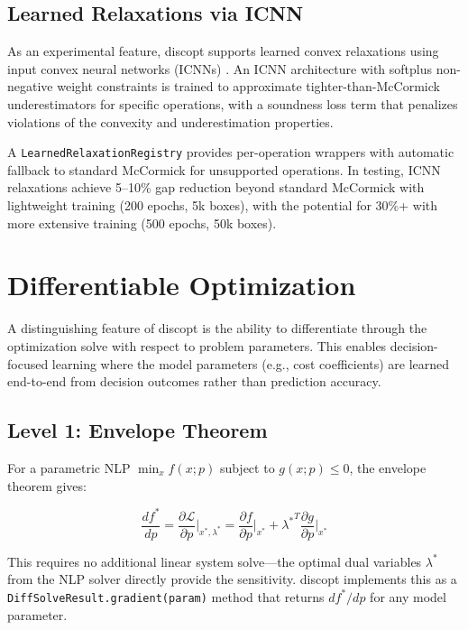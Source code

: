 \documentclass[12pt,preprint]{article}
\begin{document}
\subsection{Learned Relaxations via ICNN}
\label{org-learned-relaxations-via-icnn}
As an experimental feature, discopt supports learned convex relaxations using input convex neural networks (ICNNs) \cite{Amos2017icnn}. An ICNN architecture with softplus non-negative weight constraints is trained to approximate tighter-than-McCormick underestimators for specific operations, with a soundness loss term that penalizes violations of the convexity and underestimation properties.


A \texttt{LearnedRelaxationRegistry} provides per-operation wrappers with automatic fallback to standard McCormick for unsupported operations. In testing, ICNN relaxations achieve 5--10\% gap reduction beyond standard McCormick with lightweight training (200 epochs, 5k boxes), with the potential for 30\%+ with more extensive training (500 epochs, 50k boxes).


\section{Differentiable Optimization}
\label{org-differentiable-optimization}
A distinguishing feature of discopt is the ability to differentiate through the optimization solve with respect to problem parameters. This enables decision-focused learning \cite{Elmachtoub2022} where the model parameters (e.g., cost coefficients) are learned end-to-end from decision outcomes rather than prediction accuracy.

\subsection{Level 1: Envelope Theorem}
\label{org-level-1-envelope-theorem}
For a parametric NLP $\min_x f(x; p)$ subject to $g(x; p) \le 0$, the envelope theorem gives:


\begin{equation}
\frac{d f^*}{d p} = \frac{\partial \mathcal{L}}{\partial p}\bigg|_{x^*, \lambda^*} = \frac{\partial f}{\partial p}\bigg|_{x^*} + {\lambda^*}^T \frac{\partial g}{\partial p}\bigg|_{x^*}
\end{equation}


This requires no additional linear system solve---the optimal dual variables $\lambda^*$ from the NLP solver directly provide the sensitivity. discopt implements this as a \texttt{DiffSolveResult.gradient(param)} method that returns $df^*/dp$ for any model parameter.
\end{document}
